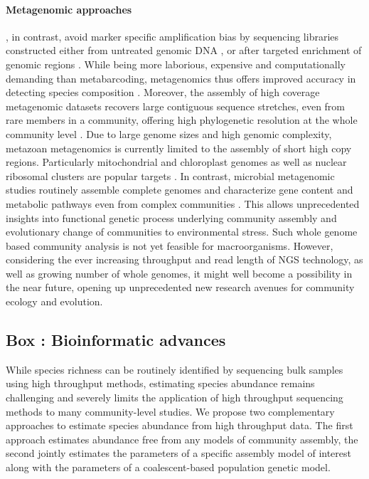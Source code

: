\documentclass[12pt]{article}
\newcounter{Box}
\begin{document}
\paragraph{Metagenomic approaches}, in contrast, avoid marker specific
amplification bias by sequencing libraries constructed either from
untreated genomic DNA \citep{dodsworth2015, linard2015}, or
after targeted enrichment of genomic regions \citep{liu2016}. While
being more laborious, expensive and computationally demanding than
metabarcoding, metagenomics thus offers improved accuracy in detecting
species composition \citep{zhou2013}. Moreover, the
assembly of high coverage metagenomic datasets recovers large
contiguous sequence stretches, even from rare members in a community,
offering high phylogenetic resolution at the whole community level
\citep{coissac2016}. Due to large genome sizes and high genomic
complexity, metazoan metagenomics is currently limited to the
assembly of short high copy regions. Particularly mitochondrial
and chloroplast genomes as well as nuclear ribosomal clusters are
popular targets \citep{dodsworth2015, coissac2016}. In contrast,
microbial metagenomic studies routinely assemble complete genomes
and characterize gene content and metabolic pathways even from complex
communities \citep{nielsen2014}. This allows unprecedented insights
into functional genetic process underlying community assembly and
evolutionary change of communities to environmental stress.  Such
whole genome based community analysis is not yet feasible for
macroorganisms. However, considering the ever increasing throughput
and read length of NGS technology, as well as
growing number of whole genomes, it might well become a possibility in
the near future, opening up unprecedented new research avenues for
community ecology and evolution.


\label{box:dry}
\subsection*{Box \theBox: Bioinformatic advances}

While species richness can be routinely identified by sequencing bulk
samples using high throughput methods, estimating species abundance
remains challenging \citep{elbrecht2015} and severely limits the
application of high throughput sequencing methods to many
community-level studies. We propose two complementary approaches to
estimate species abundance from high throughput data.  The first
approach estimates abundance free from any models of community
assembly, the second jointly estimates the parameters of a specific
assembly model of interest along with the parameters of a
coalescent-based population genetic model.
\end{document}
